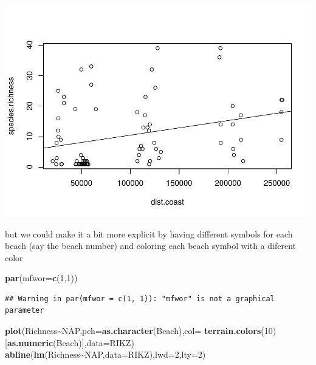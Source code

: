 \documentclass[
]{book}
\newenvironment{Shaded}{\begin{snugshade}}{\end{snugshade}}
\newcommand{\AttributeTok}[1]{\textcolor[rgb]{0.13,0.29,0.53}{#1}}
\newcommand{\DecValTok}[1]{\textcolor[rgb]{0.00,0.00,0.81}{#1}}
\newcommand{\FunctionTok}[1]{\textcolor[rgb]{0.13,0.29,0.53}{\textbf{#1}}}
\newcommand{\NormalTok}[1]{#1}
\newcommand{\SpecialCharTok}[1]{\textcolor[rgb]{0.81,0.36,0.00}{\textbf{#1}}}
\begin{document}
\includegraphics{ECOMODbook_files/figure-latex/unnamed-chunk-42-1.pdf}

but we could make it a bit more explicit by having different symbols for each beach (say the beach number) and coloring each beach symbol with a diferent color

\begin{Shaded}
\begin{Highlighting}[]
\FunctionTok{par}\NormalTok{(}\AttributeTok{mfwor=}\FunctionTok{c}\NormalTok{(}\DecValTok{1}\NormalTok{,}\DecValTok{1}\NormalTok{))}
\end{Highlighting}
\end{Shaded}

\begin{verbatim}
## Warning in par(mfwor = c(1, 1)): "mfwor" is not a graphical parameter
\end{verbatim}

\begin{Shaded}
\begin{Highlighting}[]
\FunctionTok{plot}\NormalTok{(Richness}\SpecialCharTok{\textasciitilde{}}\NormalTok{NAP,}\AttributeTok{pch=}\FunctionTok{as.character}\NormalTok{(Beach),}\AttributeTok{col=} \FunctionTok{terrain.colors}\NormalTok{(}\DecValTok{10}\NormalTok{)[}\FunctionTok{as.numeric}\NormalTok{(Beach)],}\AttributeTok{data=}\NormalTok{RIKZ)}
\FunctionTok{abline}\NormalTok{(}\FunctionTok{lm}\NormalTok{(Richness}\SpecialCharTok{\textasciitilde{}}\NormalTok{NAP,}\AttributeTok{data=}\NormalTok{RIKZ),}\AttributeTok{lwd=}\DecValTok{2}\NormalTok{,}\AttributeTok{lty=}\DecValTok{2}\NormalTok{)}
\end{Highlighting}
\end{Shaded}
\end{document}
